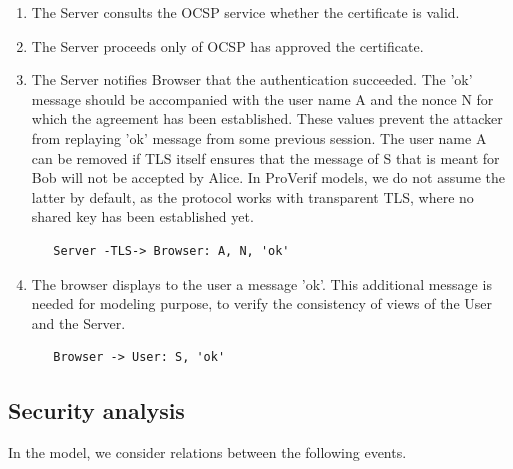 \begin{enumerate}
\item\label{item:auth:step15} The Server consults the OCSP service whether the certificate is valid.

\item\label{item:auth:step16} The Server proceeds only of OCSP has approved the certificate.

\item\label{item:auth:step17} The Server notifies Browser that the authentication succeeded. The 'ok' message should be accompanied with the user name A and the nonce N for which the agreement has been established. These values prevent the attacker from replaying 'ok' message from some previous session. The user name A can be removed if TLS itself ensures that the message of S that is meant for Bob will not be accepted by Alice. In ProVerif models, we do not assume the latter by default, as the protocol works with transparent TLS, where no shared key has been established yet.
\begin{verbatim}
   Server -TLS-> Browser: A, N, 'ok'
\end{verbatim}
\item\label{item:auth:step18} The browser displays to the user a message 'ok'. This additional message is needed for modeling purpose, to verify the consistency of views of the User and the Server.
\begin{verbatim}
   Browser -> User: S, 'ok'
\end{verbatim}
\end{enumerate}

\subsection{Security analysis}

In the model, we consider relations between the following events.


